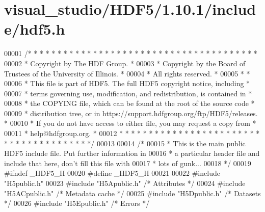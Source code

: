 \hypertarget{visual__studio_2_h_d_f5_21_810_81_2include_2hdf5_8h_source}{}\section{visual\+\_\+studio/\+H\+D\+F5/1.10.1/include/hdf5.h}
\label{visual__studio_2_h_d_f5_21_810_81_2include_2hdf5_8h_source}

\begin{DoxyCode}
00001 \textcolor{comment}{/* * * * * * * * * * * * * * * * * * * * * * * * * * * * * * * * * * * * * * *}
00002 \textcolor{comment}{ * Copyright by The HDF Group.                                               *}
00003 \textcolor{comment}{ * Copyright by the Board of Trustees of the University of Illinois.         *}
00004 \textcolor{comment}{ * All rights reserved.                                                      *}
00005 \textcolor{comment}{ *                                                                           *}
00006 \textcolor{comment}{ * This file is part of HDF5.  The full HDF5 copyright notice, including     *}
00007 \textcolor{comment}{ * terms governing use, modification, and redistribution, is contained in    *}
00008 \textcolor{comment}{ * the COPYING file, which can be found at the root of the source code       *}
00009 \textcolor{comment}{ * distribution tree, or in https://support.hdfgroup.org/ftp/HDF5/releases.  *}
00010 \textcolor{comment}{ * If you do not have access to either file, you may request a copy from     *}
00011 \textcolor{comment}{ * help@hdfgroup.org.                                                        *}
00012 \textcolor{comment}{ * * * * * * * * * * * * * * * * * * * * * * * * * * * * * * * * * * * * * * */}
00013 
00014 \textcolor{comment}{/*}
00015 \textcolor{comment}{ * This is the main public HDF5 include file.  Put further information in}
00016 \textcolor{comment}{ * a particular header file and include that here, don't fill this file with}
00017 \textcolor{comment}{ * lots of gunk...}
00018 \textcolor{comment}{ */}
00019 \textcolor{preprocessor}{#ifndef \_HDF5\_H}
00020 \textcolor{preprocessor}{#define \_HDF5\_H}
00021 
00022 \textcolor{preprocessor}{#include "H5public.h"}
00023 \textcolor{preprocessor}{#include "H5Apublic.h"}      \textcolor{comment}{/* Attributes               */}
00024 \textcolor{preprocessor}{#include "H5ACpublic.h"}     \textcolor{comment}{/* Metadata cache           */}
00025 \textcolor{preprocessor}{#include "H5Dpublic.h"}      \textcolor{comment}{/* Datasets             */}
00026 \textcolor{preprocessor}{#include "H5Epublic.h"}      \textcolor{comment}{/* Errors               */}

\end{DoxyCode}
